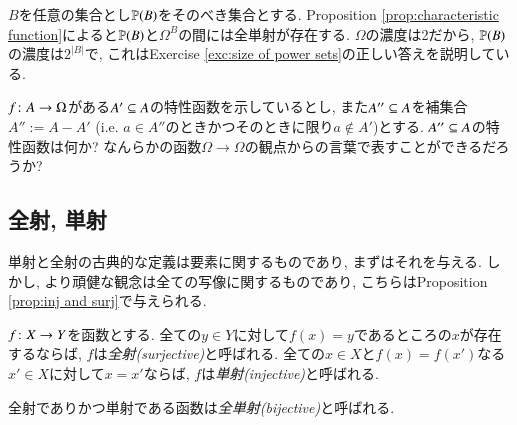 $B$を任意の集合とし$\PP(B)$をそのべき集合とする. Proposition \ref{prop:characteristic function}によると$\PP(B)$と$\Omega^B$の間には全単射が存在する. $\Omega$の濃度は2だから, $\PP(B)$の濃度は$2^{|B|}$で, これはExercise \ref{exc:size of power sets}の正しい答えを説明している.

\begin{exercise}
$f\taking A\to\Omega$がある$A'\ss A$の特性函数を示しているとし, また$A''\ss A$を補集合$A'':=A-A'$ (i.e. $a\in A''$のときかつそのときに限り$a\not\in A'$)とする.
\sexc $A''\ss A$の特性函数は何か?
\next なんらかの函数$\Omega\to\Omega$の観点からの言葉で表すことができるだろうか?
\endsexc
\end{exercise}


\subsection{全射, 単射}


単射と全射の古典的な定義は要素に関するものであり, まずはそれを与える. しかし, より頑健な観念は全ての写像に関するものであり, こちらはProposition \ref{prop:inj and surj}で与えられる.

\begin{definition}\label{def:inj,surj,bij}


$f\taking X\to Y$を函数とする. 全ての$y\in Y$に対して$f(x)=y$であるところの$x$が存在するならば, $f$は\emph{全射(surjective)}と呼ばれる. 全ての$x\in X$と$f(x)=f(x')$なる$x'\in X$に対して$x=x'$ならば, $f$は\emph{単射(injective)}と呼ばれる. 


全射でありかつ単射である函数は\emph{全単射(bijective)}と呼ばれる.

\end{definition}

